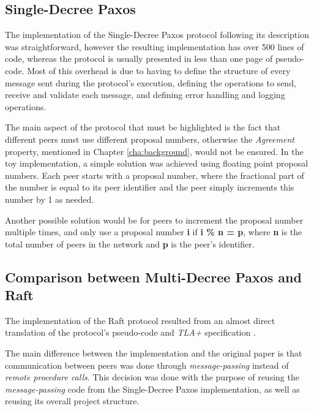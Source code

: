 \subsection{Single-Decree Paxos}

The implementation of the Single-Decree Paxos protocol following its description \cite{paxos_made_simple} was straightforward, however the resulting implementation has over 500 lines of code, whereas the protocol is usually presented in less than one page of pseudo-code. Most of this overhead is due to having to define the structure of every message sent during the protocol's execution, defining the operations to send, receive and validate each message, and defining error handling and logging operations.

\vspace{0.2cm}

The main aspect of the protocol that must be highlighted is the fact that different peers must use different proposal numbers, otherwise the \textit{Agreement} property, mentioned in Chapter \ref{cha:background}, would not be ensured. In the toy implementation, a simple solution was achieved using floating point proposal numbers. Each peer starts with a proposal number, where the fractional part of the number is equal to its peer identifier and the peer simply increments this number by 1 as needed.

Another possible solution would be for peers to increment the proposal number multiple times, and only use a proposal number \textbf{i} if \textbf{i \% n = p}, where \textbf{n} is the total number of peers in the network and \textbf{p} is the peer's identifier. 




\subsection{Comparison between Multi-Decree Paxos and Raft}

The implementation of the Raft protocol resulted from an almost direct translation of the protocol's pseudo-code \cite{raft} and \textit{TLA+} specification \cite{raft_tla}.

The main difference between the implementation and the original paper \cite{raft} is that communication between peers was done through \textit{message-passing} instead of \textit{remote procedure calls}. This decision was done with the purpose of reusing the \textit{message-passing} code from the Single-Decree Paxos implementation, as well as reusing its overall project structure.

